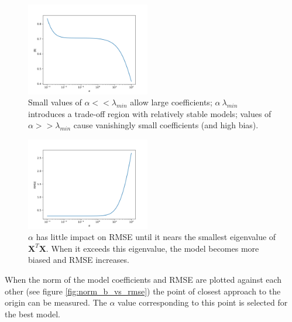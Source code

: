 \documentclass{IEEEtran}
\begin{document}
\begin{centering}
\begin{figure}
\centering
\begin{center}
	\includegraphics[width=0.48\textwidth]{norm_b_vs_alpha}
	\caption{Small values of $\alpha<<\lambda_{min}$ allow large coefficients; 
			 $\alpha ~ \lambda_{min}$ introduces a trade-off region with relatively stable models; 
			 values of $\alpha >> \lambda_{min}$ cause vanishingly small coefficients (and high bias).
			 \label{fig:norm_b_vs_alpha}}
\end{center}
\end{figure}
\end{centering}

\begin{centering}
\begin{figure}
\centering
\begin{center}
	\includegraphics[width=0.48\textwidth]{rmse_vs_alpha}
	\caption{$\alpha$ has little impact on RMSE until it nears the smallest eigenvalue of $\mathbf{X}^T 
	         \mathbf{X}$. When it exceeds this eigenvalue, the model becomes more biased and RMSE increases.
	         \label{fig:rmse_vs_alpha}}
\end{center}
\end{figure}
\end{centering}

When the norm of the model coefficients and RMSE are plotted against each other (see figure 
\ref{fig:norm_b_vs_rmse}) the point of closest approach to the origin can be measured. The $\alpha$ value 
corresponding to this point is selected for the best model. 
\end{document}
